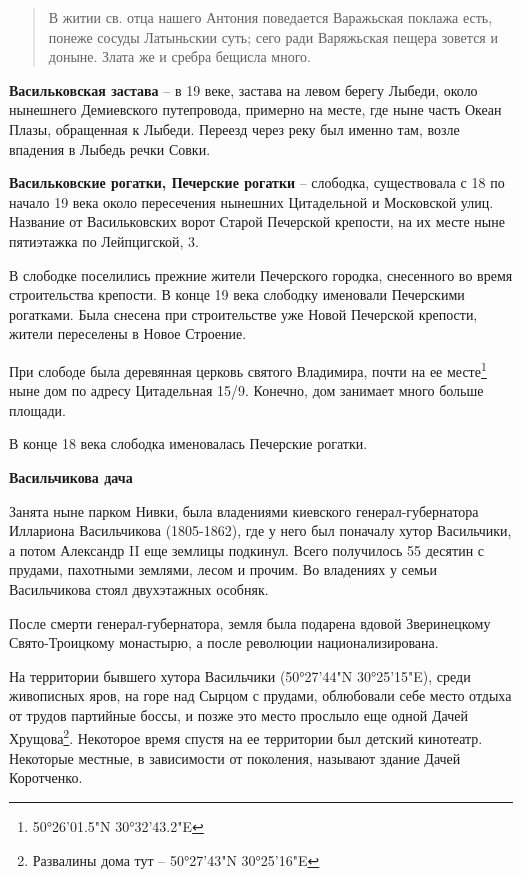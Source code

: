 \begin{quotation}
В житии св. отца нашего Антония поведается Варажьская поклажа есть, понеже сосуды Латыньскии суть; сего ради Варяжьская пещера зовется и доныне. Злата же и сребра бещисла много.
\end{quotation}

\medskip

\textbf{Васильковская застава} – в 19 веке, застава на левом берегу Лыбеди, около нынешнего Демиевского путепровода, примерно на месте, где ныне часть Океан Плазы, обращенная к Лыбеди. Переезд через реку был именно там, возле впадения в Лыбедь речки Совки.\\

\medskip

\textbf{Васильковские рогатки, Печерские рогатки} – слободка, существовала с 18 по начало 19 века около пересечения нынешних Цитадельной и Московской улиц. Название от Васильковских ворот Старой Печерской крепости, на их месте ныне пятиэтажка по Лейпцигской, 3. 

В слободке поселились прежние жители Печерского городка, снесенного во время строительства крепости. В конце 19 века слободку именовали Печерскими рогатками. Была снесена при строительстве уже Новой Печерской крепости, жители переселены в Новое Строение.

При слободе была деревянная церковь святого Владимира, почти на ее месте\footnote{50°26'01.5"N 30°32'43.2"E} ныне дом по адресу Цитадельная 15/9. Конечно, дом занимает много больше площади.

В конце 18 века слободка именовалась Печерские рогатки.\\

\medskip

\textbf{Васильчикова дача}

Занята ныне парком Нивки, была владениями киевского генерал-губернатора Иллариона Васильчикова (1805-1862), где у него был поначалу хутор Васильчики, а потом Александр II еще землицы подкинул. Всего получилось 55 десятин с прудами, пахотными землями, лесом и прочим. Во владениях у семьи Васильчикова стоял двухэтажных особняк.
 
После смерти генерал-губернатора, земля была подарена вдовой Зверинецкому Свято-Троицкому монастырю, а после революции национализирована. 

На территории бывшего хутора Васильчики (50°27'44"N 30°25'15"E), среди живописных яров, на горе над Сырцом с прудами, облюбовали себе место отдыха от трудов партийные боссы, и позже это место прослыло еще одной Дачей Хрущова\footnote{Развалины дома тут – 50°27'43"N 30°25'16"E}. Некоторое время спустя на ее территории был детский кинотеатр. Некоторые местные, в зависимости от поколения, называют здание Дачей Коротченко.

